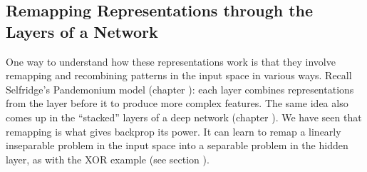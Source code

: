 \subsection{Remapping Representations through the Layers of a Network}

One way to understand how these representations work is that they involve remapping and recombining patterns in the input space in various ways. Recall Selfridge's Pandemonium model (chapter ): each layer combines representations from the layer before it to produce more complex features. The same idea also comes up in the ``stacked'' layers of a deep network (chapter ). We have seen that remapping is what gives backprop its power. It can learn to remap a linearly inseparable problem in the input space into a separable problem in the hidden layer, as with the XOR example (see section ).

